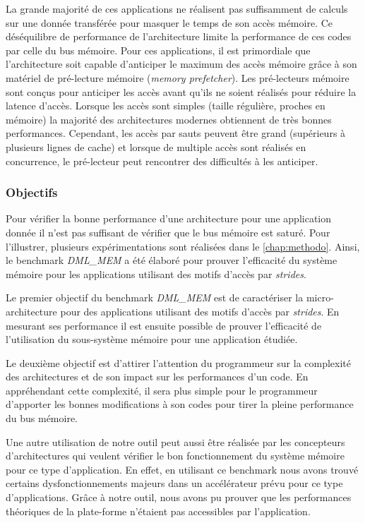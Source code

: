     
        La grande majorité de ces applications ne réalisent pas suffisamment de calculs sur une donnée transférée pour masquer le temps de son accès mémoire. Ce déséquilibre de performance de l'architecture limite la performance de ces codes par celle du bus mémoire. 
        Pour ces applications, il est primordiale que l'architecture soit capable d'anticiper le maximum des accès mémoire grâce à son matériel de pré-lecture mémoire (\textit{memory prefetcher}). Les pré-lecteurs mémoire sont conçus pour anticiper les accès avant qu'ils ne soient réalisés pour réduire la latence d'accès. Lorsque les accès sont simples (taille régulière, proches en mémoire) la majorité des architectures modernes obtiennent de très bonnes performances. Cependant, les accès par sauts peuvent être grand (supérieurs à plusieurs lignes de cache) et lorsque de multiple accès sont réalisés en concurrence, le pré-lecteur peut rencontrer des difficultés à les anticiper. 
    
        

    \subsubsection{Objectifs}
        
        Pour vérifier la bonne performance d'une architecture pour une application donnée il n'est pas suffisant de vérifier que le bus mémoire est saturé. Pour l'illustrer, plusieurs expérimentations sont réalisées dans le \autoref{chap:methodo}. Ainsi, le benchmark \textit{DML\_MEM} a été élaboré pour prouver l'efficacité du système mémoire pour les applications utilisant des motifs d'accès par \textit{strides}. 
    
        Le premier objectif du benchmark \textit{DML\_MEM} est de caractériser la micro-architecture pour des applications utilisant des motifs d'accès par \textit{strides}. En mesurant ses performance il est ensuite possible de prouver l’efficacité de l’utilisation du sous-système mémoire pour une application étudiée. 
        
        Le deuxième objectif est d'attirer l'attention du programmeur sur la complexité des architectures et de son impact sur les performances d'un code. En appréhendant cette complexité, il sera plus simple pour le programmeur d'apporter les bonnes modifications à son codes pour tirer la pleine performance du bus mémoire.
        
        Une autre utilisation de notre outil peut aussi être réalisée par les concepteurs d'architectures qui veulent vérifier le bon fonctionnement du système mémoire pour ce type d'application. En effet, en utilisant ce benchmark nous avons trouvé certains dysfonctionnements majeurs dans un accélérateur prévu pour ce type d'applications. Grâce à notre outil, nous avons pu prouver que les performances théoriques de la plate-forme n'étaient pas accessibles par l'application. 
    
